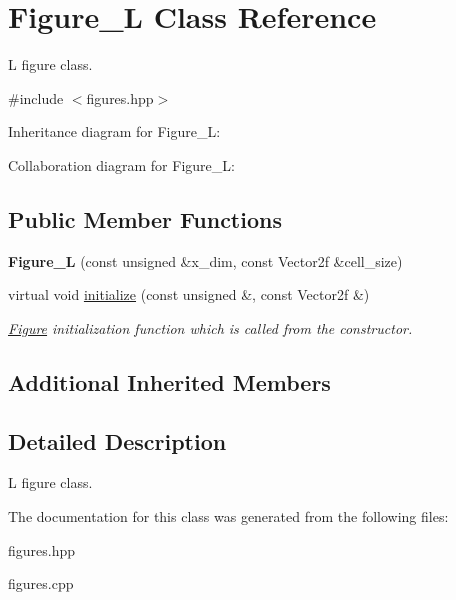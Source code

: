 \hypertarget{classFigure__L}{}\section{Figure\+\_\+L Class Reference}
\label{classFigure__L}


L figure class.  




{\ttfamily \#include $<$figures.\+hpp$>$}



Inheritance diagram for Figure\+\_\+L\+:


Collaboration diagram for Figure\+\_\+L\+:
\subsection*{Public Member Functions}
\begin{DoxyCompactItemize}
\item 
\mbox{\label{classFigure__L_aad04af8d27ddd86f974afd42929acb57}} 
{\bfseries Figure\+\_\+L} (const unsigned \&x\+\_\+dim, const Vector2f \&cell\+\_\+size)
\item 
\mbox{\label{classFigure__L_a571837b42816271de37c4cda6f36537d}} 
virtual void \hyperlink{classFigure__L_a571837b42816271de37c4cda6f36537d}{initialize} (const unsigned \&, const Vector2f \&)
\begin{DoxyCompactList}\small\item\em \hyperlink{classFigure}{Figure} initialization function which is called from the constructor. \end{DoxyCompactList}\end{DoxyCompactItemize}
\subsection*{Additional Inherited Members}


\subsection{Detailed Description}
L figure class. 

The documentation for this class was generated from the following files\+:\begin{DoxyCompactItemize}
\item 
figures.\+hpp\item 
figures.\+cpp\end{DoxyCompactItemize}
